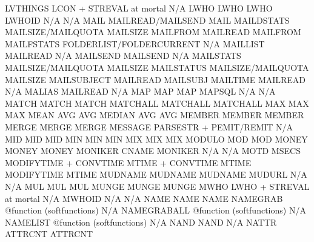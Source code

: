 \documentclass[letterpaper,10pt,english]{sphinxmanual}
\begin{document}
\begin{sphinxVerbatim}[commandchars=\\\{\}]
LVTHINGS                LCON + STREVAL at mortal     N/A
LWHO                    LWHO                         LWHO
LWHOID                  N/A                          N/A
MAIL                    MAILREAD/MAILSEND            MAIL
MAILDSTATS              MAILSIZE/MAILQUOTA           MAILSIZE
MAILFROM                MAILREAD                     MAILFROM
MAILFSTATS              FOLDERLIST/FOLDERCURRENT     N/A
MAILLIST                MAILREAD                     N/A
MAILSEND                MAILSEND                     N/A
MAILSTATS               MAILSIZE/MAILQUOTA           MAILSIZE
MAILSTATUS              MAILSIZE/MAILQUOTA           MAILSIZE
MAILSUBJECT             MAILREAD                     MAILSUBJ
MAILTIME                MAILREAD                     N/A
MALIAS                  MAILREAD                     N/A
MAP                     MAP                          MAP
MAPSQL                  N/A                          N/A
MATCH                   MATCH                        MATCH
MATCHALL                MATCHALL                     MATCHALL
MAX                     MAX                          MAX
MEAN                    AVG                          AVG
MEDIAN                  AVG                          AVG
MEMBER                  MEMBER                       MEMBER
MERGE                   MERGE                        MERGE
MESSAGE                 PARSESTR + PEMIT/REMIT       N/A
MID                     MID                          MID
MIN                     MIN                          MIN
MIX                     MIX                          MIX
MODULO                  MOD                          MOD
MONEY                   MONEY                        MONEY
MONIKER                 CNAME                        MONIKER
N/A                     N/A                          MOTD
MSECS                   MODIFYTIME + CONVTIME        MTIME + CONVTIME
MTIME                   MODIFYTIME                   MTIME
MUDNAME                 MUDNAME                      MUDNAME
MUDURL                  N/A                          N/A
MUL                     MUL                          MUL
MUNGE                   MUNGE                        MUNGE
MWHO                    LWHO + STREVAL at mortal     N/A
MWHOID                  N/A                          N/A
NAME                    NAME                         NAME
NAMEGRAB                @function (softfunctions)    N/A
NAMEGRABALL             @function (softfunctions)    N/A
NAMELIST                @function (softfunctions)    N/A
NAND                    NAND                         N/A
NATTR                   ATTRCNT                      ATTRCNT

\end{sphinxVerbatim}
\end{document}
